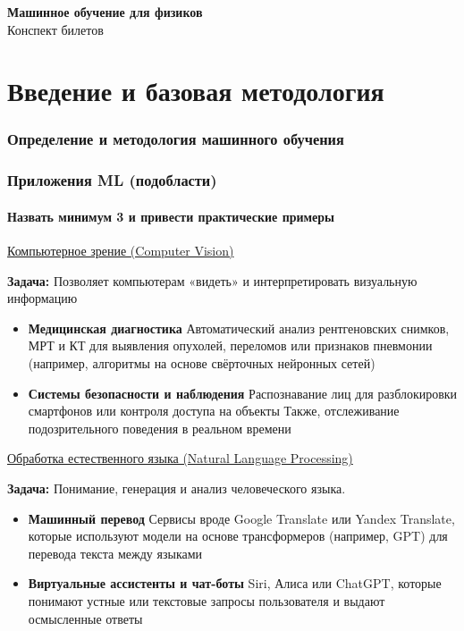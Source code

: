 \documentclass[a4paper, 14pt]{article}
\begin{document}
{\huge
    \begin{center}
    {\textbf{Машинное обучение для физиков}}
        \\
        Конспект билетов
    \end{center}
}
    \tableofcontents \newpage
    
    \part{Введение и базовая методология}
    
    \section{Определение и методология машинного обучения}
    
    
    \section{Приложения ML (подобласти)}
    
    \subsection{Назвать минимум 3 и привести практические примеры}
    
    \underline{Компьютерное зрение (Computer Vision)}
    
    \textbf{Задача:} Позволяет компьютерам «видеть» и интерпретировать визуальную информацию
    \begin{itemize}
        
        \item \textbf{Медицинская диагностика} Автоматический анализ рентгеновских снимков, МРТ и КТ для
        выявления опухолей, переломов или признаков пневмонии (например, алгоритмы на основе свёрточных нейронных сетей)
        
        \item \textbf{Системы безопасности и наблюдения} Распознавание лиц для разблокировки смартфонов
        или контроля доступа на объекты
        Также, отслеживание подозрительного поведения в реальном времени
    
    \end{itemize}
    
    \underline{Обработка естественного языка (Natural Language Processing)}
    
    \textbf{Задача:} Понимание, генерация и анализ человеческого языка.
    \begin{itemize}
        
        \item \textbf{Машинный перевод} Сервисы вроде Google Translate или Yandex Translate, которые
        используют модели на основе трансформеров (например, GPT) для перевода текста между языками
        
        \item \textbf{Виртуальные ассистенты и чат-боты} Siri, Алиса или ChatGPT, которые понимают устные или
        текстовые запросы пользователя и выдают осмысленные ответы
    
    \end{itemize}
    
\end{document}
